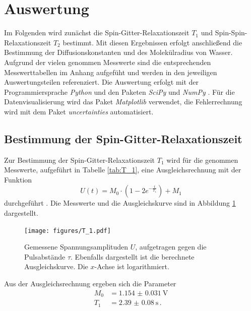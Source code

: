 \section{Auswertung}
Im Folgenden wird zunächst die Spin-Gitter-Relaxationszeit $T_1$
und Spin-Spin-Relaxationszeit $T_2$ bestimmt. Mit diesen Ergebnissen erfolgt anschließend die Bestimmung
der Diffusionskonstanten und des Molekülradius von Wasser. Aufgrund der vielen genommen Messwerte sind die entsprechenden 
Messwerttabellen im Anhang aufgefüht und werden in den jeweiligen Auswertungsteilen referenziert. 
Die Auswertung erfolgt mit der Programmiersprache \textit{Python} und den Paketen \textit{SciPy} \cite{SciPy} und
\textit{NumPy} \cite{NumPy}. Für die Datenvisualisierung wird das Paket \textit{Matplotlib} \cite{Matplotlib} 
verwendet, die Fehlerrechnung wird mit dem Paket \textit{uncertainties} \cite{uncertainties} automatisiert.

\subsection*{Bestimmung der Spin-Gitter-Relaxationszeit}
Zur Bestimmung der Spin-Gitter-Relaxationszeit $T_1$ wird für die genommen Messwerte, aufgeführt in Tabelle 
\ref{tab:T_1}, eine Ausgleichsrechnung mit der Funktion 
\begin{equation*}
    U(t) = M_0 \cdot \left(1 - 2 e^{-\frac{t}{T_1}}\right) + M_1
\end{equation*}
durchgeführt \cite{Finke}. Die Messwerte und die Ausgleichskurve sind in Abbildung \ref{fig:T_1} dargestellt.
\begin{figure}
    \centering
    \texttt{[image: figures/T\_1.pdf]}
    \caption{Gemessene Spannungsamplituden $U$, aufgetragen gegen die Pulsabstände $\tau$. Ebenfalls dargestellt
            ist die berechnete Ausgleichskurve. Die $x$-Achse ist logarithmiert.}
    \label{fig:T_1}
\end{figure}
Aus der Ausgleichsrechnung ergeben sich die Parameter
\begin{align*}
    M_0 &= \SI{1.154(31)}{\volt} \\
    T_1 &= \SI{2.39(8)}{\second} \, .
\end{align*}

